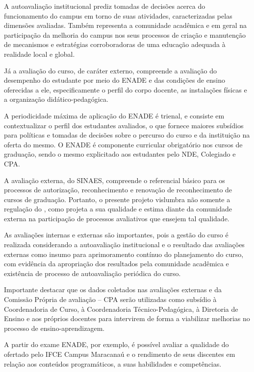 \documentclass{paper}
\begin{document}
A autoavaliação institucional prediz tomadas de decisões acerca do funcionamento do campus em torno de suas atividades, caracterizadas pelas dimensões avaliadas. Também representa a comunidade acadêmica e em geral na participação da melhoria do campus nos seus processos de criação e manutenção de mecanismos e estratégias corroboradoras de uma educação adequada à realidade local e global. 

Já a avaliação do curso, de caráter externo, compreende a avaliação do desempenho do estudante por meio do ENADE e das condições de ensino oferecidas a ele, especificamente o perfil do corpo docente, as instalações físicas e a organização didático-pedagógica. 

A periodicidade máxima de aplicação do ENADE é trienal, e consiste em contextualizar o perfil dos estudantes avaliados, o que fornece maiores subsídios para políticas e tomadas de decisões sobre o percurso do curso e da instituição na oferta do mesmo. O ENADE é componente curricular obrigatório nos cursos de graduação, sendo o mesmo explicitado aos estudantes pelo NDE, Colegiado e CPA. 

A avaliação externa, do SINAES, compreende o referencial básico para os processos de autorização, reconhecimento e renovação de reconhecimento de cursos de graduação. Portanto, o presente projeto vislumbra não somente a regulação do \NOMECURSO, como projeta a sua qualidade e estima diante da comunidade externa na participação de processos avaliativos que ensejem tal qualidade.

As avaliações internas e externas são importantes, pois a gestão do curso é realizada considerando a autoavaliação institucional e o resultado das avaliações externas como insumo para aprimoramento contínuo do planejamento do curso, com evidência da apropriação dos resultados pela comunidade acadêmica e existência de processo de autoavaliação periódica do curso.

Importante destacar que os dados coletados nas avaliações externas e da Comissão Própria de avaliação – CPA serão utilizadas como subsídio à Coordenadoria de Curso, à Coordenadoria Técnico-Pedagógica, à Diretoria de Ensino e aos próprios docentes para intervirem de forma a viabilizar melhorias no processo de ensino-aprendizagem. 

A partir do exame ENADE, por exemplo, é possível avaliar a qualidade do \NOMECURSO ofertado pelo IFCE Campus Maracanaú e o rendimento de seus discentes em relação aos conteúdos programáticos, a suas habilidades e competências. 
\end{document}
